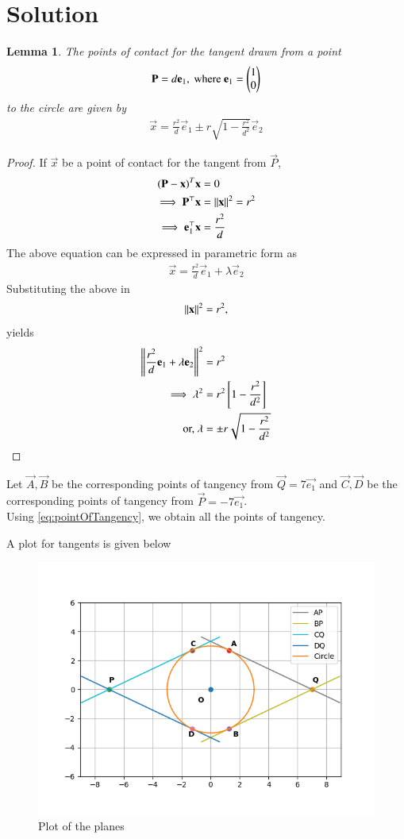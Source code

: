 \documentclass[journal,12pt,twocolumn]{IEEEtran}
\newtheorem{lemma}{Lemma}
\begin{document}
\section{Solution}
\begin{lemma}
  The points of contact for the tangent drawn from a point 
  \begin{align}
    \mathbf{P} = d\mathbf{e}_1, \text{ where } \mathbf{e}_1 = \begin{pmatrix}1\\0\end{pmatrix}
  \end{align}
  to the circle are given by 
  \begin{align}
    \vec{x} = \frac{r^2}{d}\vec{e}_1  \pm r\sqrt{1 - \frac{r^2}{d^2}} \vec{e}_2 \label{eq:pointOfTangency}
  \end{align}  
\end{lemma}
\begin{proof}
If $\vec{x}$ be a point of contact for the tangent from $\vec{P}$, 
\begin{align}
  \mathbf{(P-x)}^T\mathbf{x}&=0 \\
  \implies \mathbf{P}^{\top} \mathbf{x} &=\left\lVert\mathbf{x}\right\rVert^2 = r^2\\
  \implies \mathbf{e}_1^{\top} \mathbf{x} &= \frac{r^2}{d}
\end{align}
The above equation can be expressed in parametric form as 
\begin{align}
  \vec{x} = \frac{r^2}{d}\vec{e}_1 + \lambda \vec{e}_2
\end{align}
Substituting the above in 
\begin{align}
  \left\lVert\mathbf{x}\right\rVert^2 = r^2,
\end{align}
yields
\begin{align}
  \left\lVert\frac{r^2}{d}\mathbf{e}_1 + \lambda \mathbf{e}_2\right\rVert^2&=r^2\\
  \implies \lambda^2 &= r^2{}\left[1 - \frac{r^2}{d^2}\right]\\
  \text{or, }\lambda &= \pm r\sqrt{1 - \frac{r^2}{d^2}}
\end{align}
\end{proof}
Let $\vec{A}, \vec{B}$ be the corresponding points of tangency from $\vec{Q}=7\vec{e_1}$ and 
$\vec{C}, \vec{D}$ be the corresponding points of tangency from $\vec{P}=-7\vec{e_1}$.\\
Using \eqref{eq:pointOfTangency}, we obtain all the points of tangency.

A plot for tangents is given below
\begin{figure}[!ht]
    \centering
    \includegraphics[width=\columnwidth]{plot/figure}
    \caption{Plot of the planes}
    \label{plot}
\end{figure}
\end{document}

